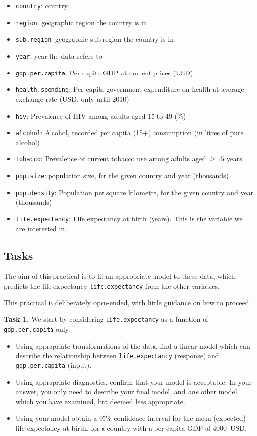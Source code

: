 \documentclass[
  a4paper,
]{article}
\providecommand{\tightlist}{%
  \setlength{\itemsep}{0pt}\setlength{\parskip}{0pt}}
\theoremstyle{definition}
\theoremstyle{definition}
\theoremstyle{definition}
\theoremstyle{definition}
\theoremstyle{remark}
\begin{document}
\begin{itemize}
\tightlist
\item
  \texttt{country}: country
\item
  \texttt{region}: geographic region the country is in
\item
  \texttt{sub.region}: geographic sub-region the country is in
\item
  \texttt{year}: year the data refers to
\item
  \texttt{gdp.per.capita}: Per capita GDP at current prices (USD)
\item
  \texttt{health.spending}: Per capita government expenditure on health at average exchange rate (USD,
  only until 2010)
\item
  \texttt{hiv}: Prevalence of HIV among adults aged 15 to 49 (\%)
\item
  \texttt{alcohol}: Alcohol, recorded per capita (15+) consumption (in litres of pure alcohol)
\item
  \texttt{tobacco}: Prevalence of current tobacco use among adults aged \(\geq 15\) years
\item
  \texttt{pop.size}: population size, for the given country and year (thousands)
\item
  \texttt{pop.density}: Population per square kilometre, for the given country and year (thousands)
\item
  \texttt{life.expectancy}: Life expectancy at birth (years). This is the variable we are interested in.
\end{itemize}

\hypertarget{tasks}{%
\subsection*{Tasks}\label{tasks}}

The aim of this practical is to fit an appropriate model to these data, which
predicts the life expectancy \texttt{life.expectancy} from the other variables.

This practical is deliberately open-ended, with little guidance on how to proceed.

\textbf{Task 1.} We start by considering \texttt{life.expectancy} as a function
of \texttt{gdp.per.capita} only.

\begin{itemize}
\item
  Using appropriate transformations of the data, find a linear model which can
  describe the relationship between \texttt{life.expectancy} (response) and
  \texttt{gdp.per.capita} (input).
\item
  Using appropriate diagnostics, confirm that your model is acceptable.
  In your answer, you only need to describe your final model, and \emph{one} other
  model which you have examined, but deemed less appropriate.
\item
  Using your model obtain a 95\% confidence interval for the mean (expected)
  life expectancy at birth, for a country with a per capita GDP of 4000~USD.
\end{itemize}
\end{document}
